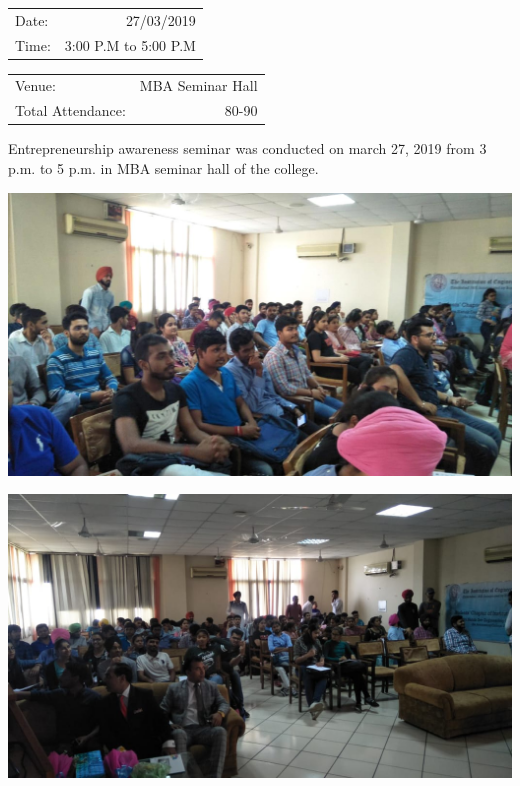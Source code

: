 \documentclass[12pt, a4 paper]{article}
\begin{document}
\begin{center}
\begin{multicols}{2}
\begin{tabular}{l r}
Date: & 27/03/2019\\ %
Time: & 3:00 P.M to 5:00 P.M \\ %
\end{tabular}
\columnbreak
\begin{tabular}{l r}
Venue: & MBA Seminar Hall \\ %
Total Attendance: & 80-90 \\ %
\end{tabular}
\end{multicols}


\begin{Large}
\begin{multicols}{2}
Entrepreneurship awareness seminar was conducted on march 27, 2019 from 3 p.m. to 5 p.m. in MBA seminar hall of the college.
\columnbreak

\includegraphics[width=\linewidth]{image2.jpg}
\end{multicols}

\begin{multicols}{2}

\includegraphics[width=\linewidth]{image7.jpeg}


\end{multicols}
\end{Large}
\end{center}
\end{document}
